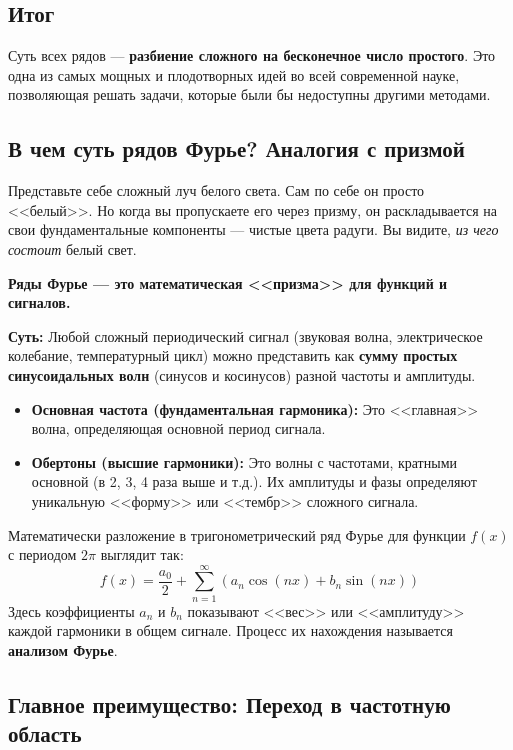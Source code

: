 \documentclass[a4paper, 12pt]{report}
\numberwithin{equation}{section}
\begin{document}
\subsection{Итог}
Суть всех рядов — \textbf{разбиение сложного на бесконечное число простого}. Это одна из самых мощных и плодотворных идей во всей современной науке, позволяющая решать задачи, которые были бы недоступны другими методами.
\subsection{В чем суть рядов Фурье? Аналогия с призмой}

Представьте себе сложный луч белого света. Сам по себе он просто <<белый>>. Но когда вы пропускаете его через призму, он раскладывается на свои фундаментальные компоненты — чистые цвета радуги. Вы видите, \textit{из чего состоит} белый свет.

\begin{center}
	\textbf{Ряды Фурье — это математическая <<призма>> для функций и сигналов.}
\end{center}

\textbf{Суть:} Любой сложный периодический сигнал (звуковая волна, электрическое колебание, температурный цикл) можно представить как \textbf{сумму простых синусоидальных волн} (синусов и косинусов) разной частоты и амплитуды.

\begin{itemize}
	\item \textbf{Основная частота (фундаментальная гармоника):} Это <<главная>> волна, определяющая основной период сигнала.
	\item \textbf{Обертоны (высшие гармоники):} Это волны с частотами, кратными основной (в 2, 3, 4 раза выше и т.д.). Их амплитуды и фазы определяют уникальную <<форму>> или <<тембр>> сложного сигнала.
\end{itemize}

Математически разложение в тригонометрический ряд Фурье для функции $f(x)$ с периодом $2\pi$ выглядит так:
\begin{equation*}
	f(x) = \frac{a_0}{2} + \sum_{n=1}^{\infty} \left( a_n \cos(nx) + b_n \sin(nx) \right)
\end{equation*}
Здесь коэффициенты $a_n$ и $b_n$ показывают <<вес>> или <<амплитуду>> каждой гармоники в общем сигнале. Процесс их нахождения называется \textbf{анализом Фурье}.

\subsection{Главное преимущество: Переход в частотную область}
\end{document}
